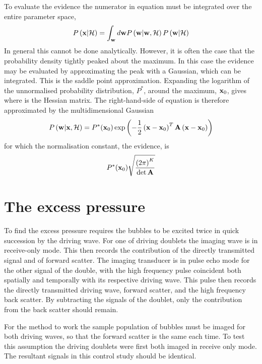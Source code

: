 To evaluate the evidence the numerator in equation  must be integrated over the entire parameter space,
\begin{align}
  P\left( \mathbf{x}|{\cal H} \right) = \int_{\mathbf{w}} d\mathbf{w} P\left( \mathbf{w}|\mathbf{w},{\cal H} \right) P\left( \mathbf{w}|{\cal H} \right)
\end{align}
In general this cannot be done analytically.
However, it is often the case that the probability density tightly peaked about the maximum.
In this case the evidence may be evaluated by approximating the peak with a Gaussian, which can be integrated.
This is the saddle point approximation.
Expanding the logarithm of the  unnormalised probability distribution, $P^\ast$, 
around the maximum, $\mathbf{x}_0$,
gives
where 
is the Hessian matrix.
The right-hand-side of equation   is therefore approximated by the multidimensional Gaussian
\begin{align}
   P\left( \mathbf{w}|\mathbf{x},{\cal H} \right) = P^\ast(\mathbf{x}_0) \exp \left( - \frac{1}{2}\left( \mathbf{x}-\mathbf{x}_0 \right)^T \textbf{A}\left( \mathbf{x}-\mathbf{x}_0  \right) \right)
\end{align}
for which the normalisation constant, the evidence, is 
\begin{align}
   P^\ast(\mathbf{x}_0) \sqrt{\frac{\left( 2\pi \right)^K}{\det \textbf{A}}}
\end{align}

\section{The excess pressure}\label{sec:exp:EP}



To find the excess pressure requires the bubbles to be excited twice in quick succession
by the driving wave.
For one of driving doublets the imaging wave is in receive-only mode.
This then records the contribution of the directly transmitted signal
and of forward scatter.
The imaging transducer is in pulse echo mode for the other signal of the double,
with the high frequency pulse coincident both spatially and temporally with its respective driving wave.
This pulse then records the directly transmitted driving wave, forward scatter,
and the high frequency back scatter.
By subtracting the signals of the doublet,
only the contribution from the back scatter should remain.

For the method to work the sample population of bubbles must be imaged 
for both driving waves, so that the forward scatter is the same each time.
To test this assumption the driving doublets were first both imaged in receive only mode.
The resultant signals in this control study should be identical.



